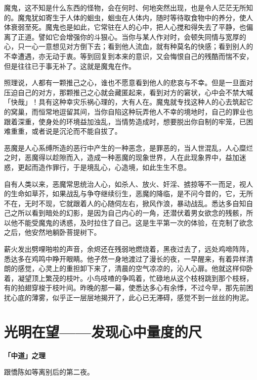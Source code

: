 \documentclass[12pt,twoside,openany]{book}
\newcommand{\mt}[1]{\textbullet \textbf{#1}}
\begin{document}
魔鬼，这不知是什么东西的怪物，会在何时、何地突然出现，也是令人茫茫无所知的。魔鬼犹如寄生于人体的蛔虫，蛔虫在人体内，随时等待取食物中的养分，使人体衰弱至死。魔鬼也是如此，它常驻在人的心中，把人心搅和得失去了平静，也偏离了正道。譬如它会增强你的斗狠心。当你与某人作对时，会顿失同情与宽厚的心，只一心一意想见对方倒下去；看到他人流血，就有种莫名的快感；看到别人的不幸遭遇，亦无动于衷。等到回复到本来的意识，又会悔恨自己的残酷而惴不安，但是往往已于事无补了。这就是魔鬼在作。

照理说，人都有一颗推己之心，谁也不愿意看到他人的悲哀与不幸。但是一旦面对压迫自己的对方，那颗推己之心就会藏匿起来，看到对方的窘状，心中会不禁大喊「快哉」！具有这种幸灾乐祸心理的，大有人在。魔鬼就专找这种人的心去筑起它的窝巢，而恒常地逗留其间，当你自陷这种玩弄他人不幸的境地时，自己的罪业也跟着深重，使身处的环境益加浊乱，当情势造成时，想要脱出你自制的牢笼，已困难重重，或者说是沉沦而不能自拔了。

恶魔是人心系缚所造的恶行中产生的一种恶念，是罪恶的，当人世混乱，人心糜烂之时，恶魔得以趁隙而入，造成一种恶魔的现象世界，人在此现象界中，益加迷惑，更起而造作罪行，于是境乱心，心造境，如此生生不息。

自有人类以来，恶魔常思统治人心，如杀人、放火、奸淫、掳掠等不一而足，视人的生命如草芥，如果战乱与争夺继续衍生，恶魔的降临，是不问今昔的，它，无所不在，无时不现，它就跟着人的心随伺左右，掀风作浪，暴动战乱。悉达多自知自己之所以看到暗处的幻影，是因为自己内心的一角，还潜伏着男女欲念的残骸，所以他不能受魔鬼的诱惑，及时拉住了自己。这是生平第一次的体验，在克制了欲念之后，他安然地躺卧菩提树下。

薪火发出劈哩啪啦的声音，余烬还在残弱地燃烧着，黑夜过去了，远处鸡啼阵阵，悉达多在鸡鸣中睁开眼睛。他孑然一身地渡过了漫长的夜，一早醒来，有着异样清朗的感觉，心灵上的重担卸下来了，清晨的空气凉凉的，沁人心扉。他就这样仰卧着，凝望顶上繁茂的枝叶。小鸟吱喳的争鸣着，忙碌地从这个枝枒跳到那个枝枒，有的拍翅穿梭于枝叶间。昨晚的那一幕，使悉达多心有余悸，不过今早，那先前困扰心底的薄雾，似乎正一层层地揭开了，此心已无滞碍，感觉不到一丝丝的拘泥。

\section{光明在望——发现心中量度的尺}\label{sec1.11}

\mt{「中道」之理}

跟憍陈如等离别后的第二夜。
\end{document}
